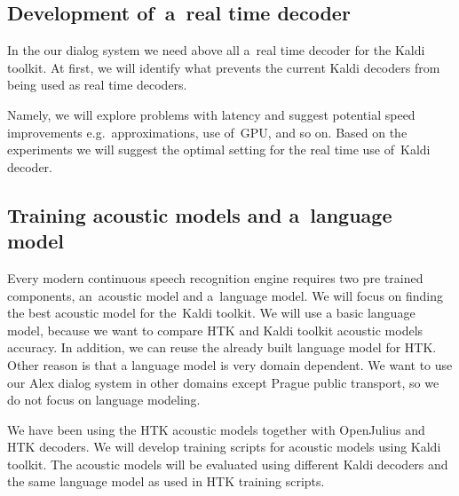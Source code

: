 


\subsection{Development of~a~real time decoder}
\label{sub:kaldi_rt_decoder}
In the our dialog system we need above all a~real time decoder for the Kaldi toolkit. At first, we will identify what prevents the current Kaldi decoders from being used as real time decoders. 

Namely, we will explore problems with latency and suggest potential speed improvements e.g.\ approximations, use of~GPU, and so on. Based on the experiments we will suggest the optimal setting for the real time use of~Kaldi decoder.


\subsection{Training acoustic models and a~language model} 
\label{sub:training_kaldi_acoustic_models}
Every modern continuous speech recognition engine requires two pre trained components, an~acoustic model and a~language model. We will focus on finding the best acoustic model for the~Kaldi toolkit. We will use a basic language model, because we want to compare HTK and Kaldi toolkit acoustic models accuracy.  In addition, we can reuse the already built language model for HTK. Other reason is that a language model is very domain dependent. %
We want to use our Alex dialog system in other domains except Prague public transport, so we do not focus on language modeling. 

We have been using the HTK acoustic models together with OpenJulius and HTK decoders. We will develop training scripts for acoustic models using Kaldi toolkit. The acoustic models will be evaluated using different Kaldi decoders and the same language model as used in HTK training scripts. 

